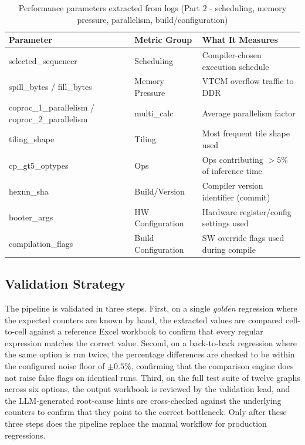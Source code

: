 \begin{table}[htb]
\fontsize{10}{12}\selectfont
\centering
\caption{Performance parameters extracted from logs (Part 2 - scheduling, memory pressure, parallelism, build/configuration)}
\label{tab:params2}
\begin{tabular}{|p{4cm}|p{3.5cm}|p{6cm}|}
\hline
\textbf{Parameter} & \textbf{Metric Group} & \textbf{What It Measures}\\
\hline
selected\_sequencer & Scheduling & Compiler-chosen execution schedule\\\hline
spill\_bytes / fill\_bytes & Memory Pressure & VTCM overflow traffic to DDR\\\hline
coproc\_1\_parallelism / coproc\_2\_parallelism & multi\_calc & Average parallelism factor\\\hline
tiling\_shape & Tiling & Most frequent tile shape used\\\hline
cp\_gt5\_optypes & Ops & Ops contributing $>5$\% of inference time\\\hline
hexnn\_sha & Build/Version & Compiler version identifier (commit)\\\hline
booter\_args & HW Configuration & Hardware register/config settings used\\\hline
compilation\_flags & Build Configuration & SW override flags used during compile\\
\hline
\end{tabular}
\end{table}

\subsection{Validation Strategy}
The pipeline is validated in three steps. First, on a single \textit{golden} regression where the expected counters are known by hand, the extracted values are compared cell-to-cell against a reference Excel workbook to confirm that every regular expression matches the correct value. Second, on a back-to-back regression where the same option is run twice, the percentage differences are checked to be within the configured noise floor of \(\pm 0.5\%\), confirming that the comparison engine does not raise false flags on identical runs. Third, on the full test suite of twelve graphs across six options, the output workbook is reviewed by the validation lead, and the LLM-generated root-cause hints are cross-checked against the underlying counters to confirm that they point to the correct bottleneck. Only after these three steps does the pipeline replace the manual workflow for production regressions.

